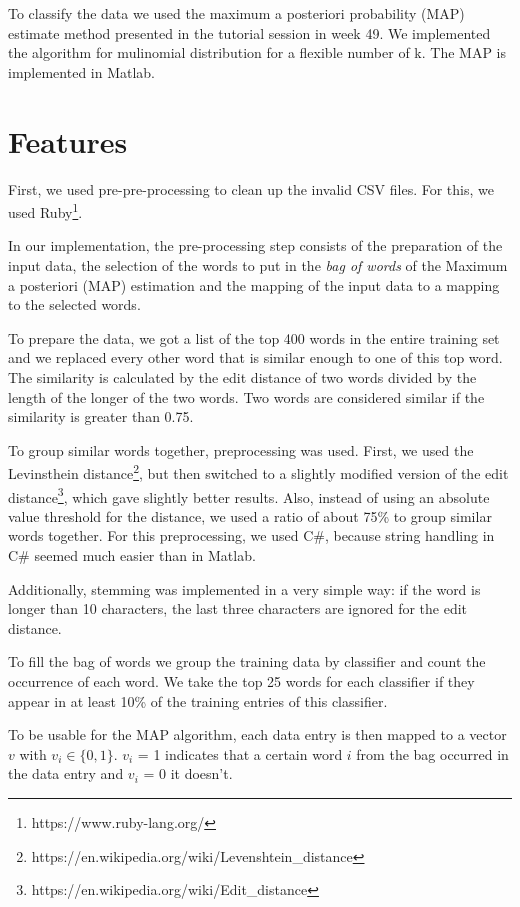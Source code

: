 \documentclass[a4paper, 11pt]{article}
\begin{document}
To classify the data we used the maximum a posteriori probability (MAP) estimate method presented in the tutorial session in week 49. We implemented the algorithm for mulinomial distribution for a flexible number of k. The MAP is implemented in Matlab.


\section{Features}
First, we used pre-pre-processing to clean up the invalid CSV files. For this, we used Ruby\footnote{https://www.ruby-lang.org/}.

In our implementation, the pre-processing step consists of the preparation of the input data, the selection of the words to put in the \textit{bag of words} of the Maximum a posteriori (MAP) estimation and the mapping of the input data to a mapping to the selected words. 

To prepare the data, we got a list of the top 400 words in the entire training set and we replaced every other word that is similar enough to one of this top word. The similarity is calculated by the edit distance of two words divided by the length of the longer of the two words. Two words are considered similar if the similarity is greater than 0.75.

To group similar words together, preprocessing was used. First, we used the Levinsthein distance\footnote{https://en.wikipedia.org/wiki/Levenshtein\_distance}, but then switched to a slightly modified version of the edit distance\footnote{https://en.wikipedia.org/wiki/Edit\_distance}, which gave slightly better results. Also, instead of using an absolute value threshold for the distance, we used a ratio of about 75\% to group similar words together. For this preprocessing, we used C\#, because string handling in C\# seemed much easier than in Matlab.

Additionally, stemming was implemented in a very simple way: if the word is longer than 10 characters, the last three characters are ignored for the edit distance.

To fill the bag of words we group the training data by classifier and count the occurrence of each word. We take the top 25 words for each classifier if they appear in at least 10\% of the training entries of this classifier.

To be usable for the MAP algorithm, each data entry is then mapped to a vector $v$ with $v_i \in \lbrace0, 1\rbrace$. $v_i$ = 1 indicates that a certain word $i$ from the bag occurred in the data entry and $v_i$ = 0 it doesn't.
\end{document}
